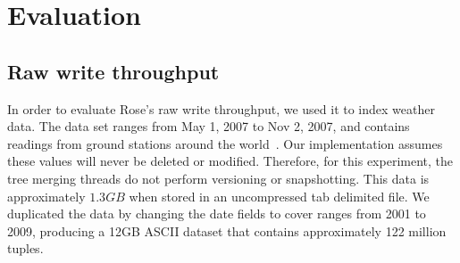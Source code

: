 \documentclass{vldb}
\newcommand{\rowss}{Rose's\xspace}
\begin{document}






\section{Evaluation}

\subsection{Raw write throughput}

In order to evaluate \rowss raw write throughput, we used it to index
weather data.  The data set ranges from May 1,
2007 to Nov 2, 2007, and contains readings from ground stations around
the world~\cite{nssl}.  Our implementation assumes these values will never be deleted or modified.  Therefore, for this experiment, the tree merging threads do not perform versioning or snapshotting.  This data is approximately $1.3GB$ when stored in an
uncompressed tab delimited file.  We duplicated the data by changing
the date fields to cover ranges from 2001 to 2009, producing a 12GB
ASCII dataset that contains approximately 122 million tuples.
\end{document}
